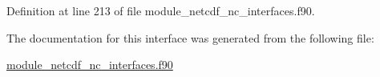 Definition at line 213 of file module\+\_\+netcdf\+\_\+nc\+\_\+interfaces.\+f90.



The documentation for this interface was generated from the following file\+:\begin{DoxyCompactItemize}
\item 
\hyperlink{module__netcdf__nc__interfaces_8f90}{module\+\_\+netcdf\+\_\+nc\+\_\+interfaces.\+f90}\end{DoxyCompactItemize}

